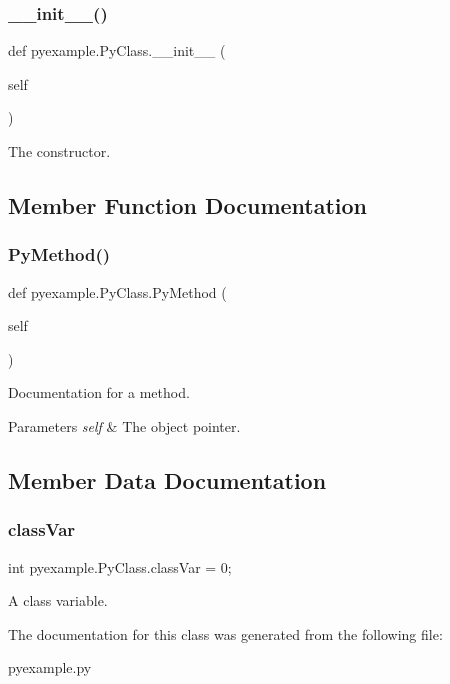 \subsubsection{\texorpdfstring{\+\_\+\+\_\+init\+\_\+\+\_\+()}{\_\_init\_\_()}}
{\footnotesize\ttfamily def pyexample.\+Py\+Class.\+\_\+\+\_\+init\+\_\+\+\_\+ (\begin{DoxyParamCaption}\item[{}]{self }\end{DoxyParamCaption})}



The constructor. 



\subsection{Member Function Documentation}
\mbox{\label{classpyexample_1_1PyClass_a654596774eb28a0c6d26eea565de3a9d}} 
\subsubsection{\texorpdfstring{Py\+Method()}{PyMethod()}}
{\footnotesize\ttfamily def pyexample.\+Py\+Class.\+Py\+Method (\begin{DoxyParamCaption}\item[{}]{self }\end{DoxyParamCaption})}



Documentation for a method. 


\begin{DoxyParams}{Parameters}
{\em self} & The object pointer. \\
\hline
\end{DoxyParams}


\subsection{Member Data Documentation}
\mbox{\label{classpyexample_1_1PyClass_abd17aff54e5b0ca194020c796c733546}} 
\subsubsection{\texorpdfstring{class\+Var}{classVar}}
{\footnotesize\ttfamily int pyexample.\+Py\+Class.\+class\+Var = 0;\hspace{0.3cm}{\ttfamily [static]}}



A class variable. 



The documentation for this class was generated from the following file\+:\begin{DoxyCompactItemize}
\item 
pyexample.\+py\end{DoxyCompactItemize}

